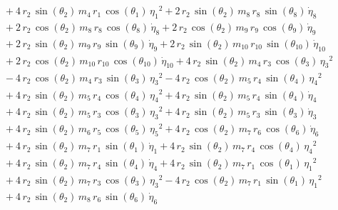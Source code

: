 \begin{eqnarray*}
 \\ &&\quad\mbox{} + 4\,r_{2}\,\sin({\theta_{2}})\,m_{4}\,r_{1}\,\cos(
{\theta_{1}})\,{{\eta_{1}}}^2 + 2\,r_{2}\,\sin({\theta_{2}})\,m_{8}\,r
_{8}\,\sin({\theta_{8}})\,{\dot{\eta}_{8}} \\ &&\quad\mbox{} + 2\,r_{2
}\,\cos({\theta_{2}})\,m_{8}\,r_{8}\,\cos({\theta_{8}})\,{\dot{\eta}_{
8}} + 2\,r_{2}\,\cos({\theta_{2}})\,m_{9}\,r_{9}\,\cos({\theta_{9}})\,
{\dot{\eta}_{9}} \\ &&\quad\mbox{} + 2\,r_{2}\,\sin({\theta_{2}})\,m_{
9}\,r_{9}\,\sin({\theta_{9}})\,{\dot{\eta}_{9}} + 2\,r_{2}\,\sin({
\theta_{2}})\,m_{10}\,r_{10}\,\sin({\theta_{10}})\,{\dot{\eta}_{10}}
 \\ &&\quad\mbox{} + 2\,r_{2}\,\cos({\theta_{2}})\,m_{10}\,r_{10}\,
\cos({\theta_{10}})\,{\dot{\eta}_{10}} + 4\,r_{2}\,\sin({\theta_{2}})
\,m_{4}\,r_{3}\,\cos({\theta_{3}})\,{{\eta_{3}}}^2 \\ &&\quad\mbox{}
 - 4\,r_{2}\,\cos({\theta_{2}})\,m_{4}\,r_{3}\,\sin({\theta_{3}})\,{{
\eta_{3}}}^2 - 4\,r_{2}\,\cos({\theta_{2}})\,m_{5}\,r_{4}\,\sin({
\theta_{4}})\,{{\eta_{4}}}^2 \\ &&\quad\mbox{} + 4\,r_{2}\,\sin({
\theta_{2}})\,m_{5}\,r_{4}\,\cos({\theta_{4}})\,{{\eta_{4}}}^2 + 4\,r
_{2}\,\sin({\theta_{2}})\,m_{5}\,r_{4}\,\sin({\theta_{4}})\,{
\dot{\eta}_{4}} \\ &&\quad\mbox{} + 4\,r_{2}\,\sin({\theta_{2}})\,m_{5
}\,r_{3}\,\cos({\theta_{3}})\,{{\eta_{3}}}^2 + 4\,r_{2}\,\sin({\theta
_{2}})\,m_{5}\,r_{3}\,\sin({\theta_{3}})\,{\dot{\eta}_{3}}
 \\ &&\quad\mbox{} + 4\,r_{2}\,\sin({\theta_{2}})\,m_{6}\,r_{5}\,\cos(
{\theta_{5}})\,{{\eta_{5}}}^2 + 4\,r_{2}\,\cos({\theta_{2}})\,m_{7}\,r
_{6}\,\cos({\theta_{6}})\,{\dot{\eta}_{6}} \\ &&\quad\mbox{} + 4\,r_{2
}\,\sin({\theta_{2}})\,m_{7}\,r_{1}\,\sin({\theta_{1}})\,{\dot{\eta}_{
1}} + 4\,r_{2}\,\sin({\theta_{2}})\,m_{7}\,r_{4}\,\cos({\theta_{4}})\,
{{\eta_{4}}}^2 \\ &&\quad\mbox{} + 4\,r_{2}\,\sin({\theta_{2}})\,m_{7}
\,r_{4}\,\sin({\theta_{4}})\,{\dot{\eta}_{4}} + 4\,r_{2}\,\sin({\theta
_{2}})\,m_{7}\,r_{1}\,\cos({\theta_{1}})\,{{\eta_{1}}}^2
 \\ &&\quad\mbox{} + 4\,r_{2}\,\sin({\theta_{2}})\,m_{7}\,r_{3}\,\cos(
{\theta_{3}})\,{{\eta_{3}}}^2 - 4\,r_{2}\,\cos({\theta_{2}})\,m_{7}\,r
_{1}\,\sin({\theta_{1}})\,{{\eta_{1}}}^2 \\ &&\quad\mbox{} + 4\,r_{2}
\,\sin({\theta_{2}})\,m_{8}\,r_{6}\,\sin({\theta_{6}})\,{\dot{\eta}_{6
}}
\end{eqnarray*}
